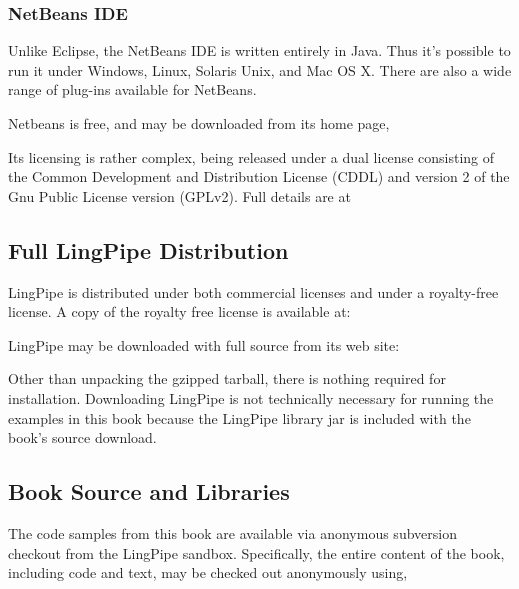 \subsubsection{NetBeans IDE}

Unlike Eclipse, the NetBeans IDE is written entirely in Java.  Thus
it's possible to run it under Windows, Linux, Solaris Unix, and Mac OS
X. There are also a wide range of plug-ins available for NetBeans.

Netbeans is free, and may be downloaded from its home page,
%
\begin{quote}
\end{quote}
%
Its licensing is rather complex, being released under a dual license
consisting of the Common Development and Distribution License (CDDL)
and version 2 of the Gnu Public License version (GPLv2).  Full details
are at
%
\begin{quote}
\end{quote}


\subsection{Full LingPipe Distribution}

LingPipe is distributed under both commercial licenses
and under a royalty-free license.  A copy of the royalty free
license is available at:
%
\begin{quote}
\end{quote}

LingPipe may be downloaded with full source from its web site:
%
\begin{quote}
\end{quote}
%
Other than unpacking the gzipped tarball, there is nothing required
for installation.  Downloading LingPipe is not technically necessary for
running the examples in this book because the LingPipe library jar is
included with the book's source download.


\subsection{Book Source and Libraries}

The code samples from this book are available via anonymous subversion checkout
from the LingPipe sandbox.  Specifically, the entire content of the book,
including code and text, may be checked out anonymously using,

